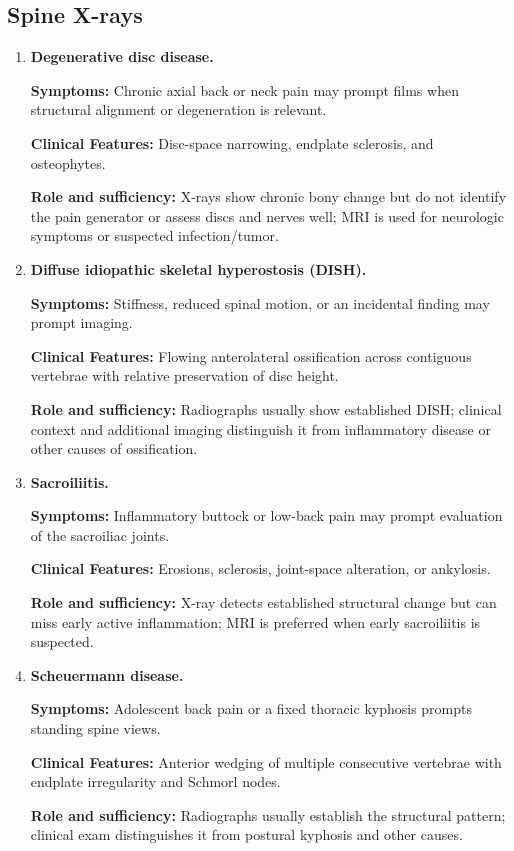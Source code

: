 \subsection{Spine X-rays}
\begin{enumerate}[leftmargin=*,itemsep=0.45em,topsep=0.4em]
\item \textbf{Degenerative disc disease.}\par\noindent\textbf{Symptoms:} Chronic axial back or neck pain may prompt films when structural alignment or degeneration is relevant.\par\noindent\textbf{Clinical Features:} Disc-space narrowing, endplate sclerosis, and osteophytes.\par\noindent\textbf{Role and sufficiency:} X-rays show chronic bony change but do not identify the pain generator or assess discs and nerves well; MRI is used for neurologic symptoms or suspected infection/tumor.
\item \textbf{Diffuse idiopathic skeletal hyperostosis (DISH).}\par\noindent\textbf{Symptoms:} Stiffness, reduced spinal motion, or an incidental finding may prompt imaging.\par\noindent\textbf{Clinical Features:} Flowing anterolateral ossification across contiguous vertebrae with relative preservation of disc height.\par\noindent\textbf{Role and sufficiency:} Radiographs usually show established DISH; clinical context and additional imaging distinguish it from inflammatory disease or other causes of ossification.
\item \textbf{Sacroiliitis.}\par\noindent\textbf{Symptoms:} Inflammatory buttock or low-back pain may prompt evaluation of the sacroiliac joints.\par\noindent\textbf{Clinical Features:} Erosions, sclerosis, joint-space alteration, or ankylosis.\par\noindent\textbf{Role and sufficiency:} X-ray detects established structural change but can miss early active inflammation; MRI is preferred when early sacroiliitis is suspected.
\item \textbf{Scheuermann disease.}\par\noindent\textbf{Symptoms:} Adolescent back pain or a fixed thoracic kyphosis prompts standing spine views.\par\noindent\textbf{Clinical Features:} Anterior wedging of multiple consecutive vertebrae with endplate irregularity and Schmorl nodes.\par\noindent\textbf{Role and sufficiency:} Radiographs usually establish the structural pattern; clinical exam distinguishes it from postural kyphosis and other causes.

\end{enumerate}
